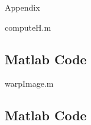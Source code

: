 \documentclass[a4paper,12pt]{article}
\begin{document}
\clearpage
\begin{section}{Appendix}
\begin{subsection}{computeH.m}
\section*{Matlab Code}



\end{subsection}


\clearpage



\begin{subsection}{warpImage.m}
\section*{Matlab Code}



\end{subsection}

\end{section}
\end{document}
